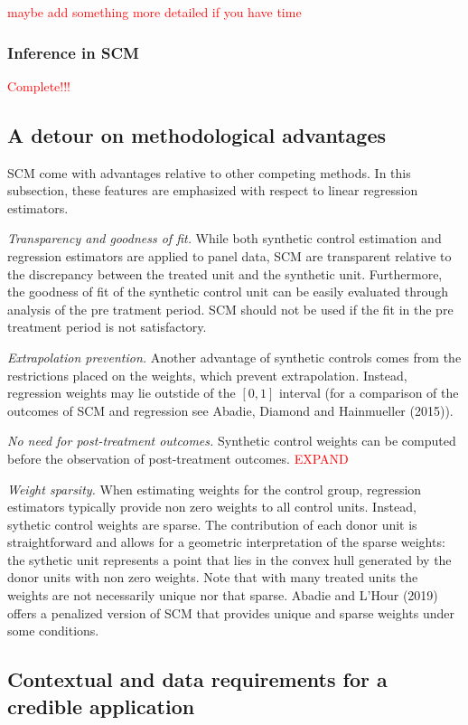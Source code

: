 \documentclass[12pt,a4paper,draft]{article}
\begin{document}
\textcolor{red}{maybe add something more detailed if you have time}


\subsubsection{Inference in SCM}
\textcolor{red}{Complete!!!}

\subsection{A detour on methodological advantages}
SCM come with advantages relative to other competing methods. In this subsection, 
these features are emphasized with respect to linear regression estimators. 

\emph{Transparency and goodness of fit.} While both 
synthetic control estimation and regression estimators are applied to panel data, 
SCM are transparent relative to the discrepancy between the treated unit and the 
synthetic unit. Furthermore, the goodness of fit of the synthetic control unit 
can be easily evaluated through analysis of the pre tratment period. SCM should 
not be used if the fit in the pre treatment period is not satisfactory.

\emph{Extrapolation prevention.} Another advantage of synthetic controls comes from the 
restrictions placed on the weights, which prevent extrapolation. Instead, 
regression weights may lie outstide of the $[0,1]$ interval (for a comparison 
of the outcomes of SCM and regression see Abadie, Diamond and Hainmueller (2015)). 

\emph{No need for post-treatment outcomes.} Synthetic control weights can be computed 
before the observation of post-treatment outcomes. \textcolor{red}{EXPAND}

\emph{Weight sparsity.} When estimating weights for 
the control group, regression estimators typically provide non zero weights to all control 
units. Instead, sythetic control weights are sparse. The contribution of each 
donor unit is straightforward and allows for a geometric interpretation of the 
sparse weights: the sythetic unit represents a point that lies in the convex hull 
generated by the donor units with non zero weights.
Note that with many treated units the weights are not necessarily unique nor 
that sparse. Abadie and L'Hour (2019) offers a penalized version of SCM that 
provides unique and sparse weights under some conditions.

\subsection{Contextual and data requirements for a credible application}
\end{document}
